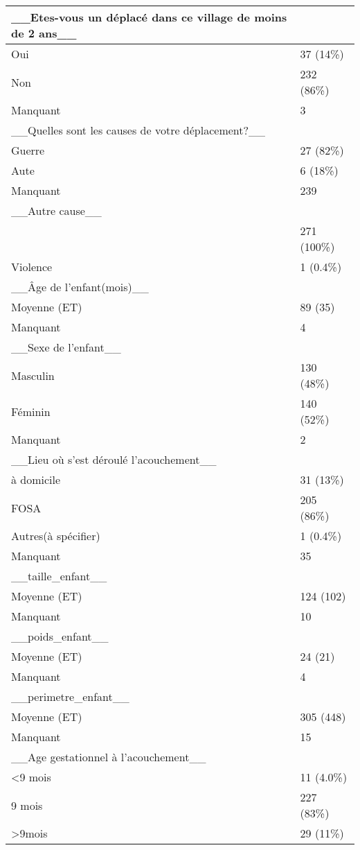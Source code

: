 \documentclass[
]{book}
\begin{document}
\begin{tabular}{l|l}
\hline
\_\_Etes-vous un déplacé dans ce village de moins de 2 ans\_\_ & \\
\hline
Oui & 37 (14\%)\\
\hline
Non & 232 (86\%)\\
\hline
Manquant & 3\\
\hline
\_\_Quelles sont les causes de votre déplacement?\_\_ & \\
\hline
Guerre & 27 (82\%)\\
\hline
Aute & 6 (18\%)\\
\hline
Manquant & 239\\
\hline
\_\_Autre cause\_\_ & \\
\hline
 & 271 (100\%)\\
\hline
Violence & 1 (0.4\%)\\
\hline
\_\_Âge de l'enfant(mois)\_\_ & \\
\hline
Moyenne  (ET) & 89  (35)\\
\hline
Manquant & 4\\
\hline
\_\_Sexe de l'enfant\_\_ & \\
\hline
Masculin & 130 (48\%)\\
\hline
Féminin & 140 (52\%)\\
\hline
Manquant & 2\\
\hline
\_\_Lieu où s'est déroulé l'acouchement\_\_ & \\
\hline
à domicile & 31 (13\%)\\
\hline
FOSA & 205 (86\%)\\
\hline
Autres(à spécifier) & 1 (0.4\%)\\
\hline
Manquant & 35\\
\hline
\_\_taille\_enfant\_\_ & \\
\hline
Moyenne  (ET) & 124  (102)\\
\hline
Manquant & 10\\
\hline
\_\_poids\_enfant\_\_ & \\
\hline
Moyenne  (ET) & 24  (21)\\
\hline
Manquant & 4\\
\hline
\_\_perimetre\_enfant\_\_ & \\
\hline
Moyenne  (ET) & 305  (448)\\
\hline
Manquant & 15\\
\hline
\_\_Age gestationnel à l'acouchement\_\_ & \\
\hline
<9 mois & 11 (4.0\%)\\
\hline
9 mois & 227 (83\%)\\
\hline
>9mois & 29 (11\%)\\

\end{tabular}
\end{document}
